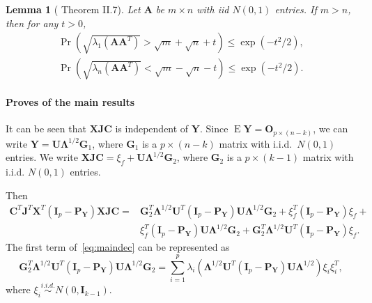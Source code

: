 \documentclass[12pt]{article} %
\DeclareMathOperator{\myE}{E}
\newcommand{\bA}{\mathbf{A}}
\newcommand{\bX}{\mathbf{X}}
\newcommand{\bP}{\mathbf{P}}
\newcommand{\bY}{\mathbf{Y}}
\newcommand{\bG}{\mathbf{G}}
\newcommand{\bJ}{\mathbf{J}}
\newcommand{\bC}{\mathbf{C}}
\newcommand{\bO}{\mathbf{O}}
\newcommand{\bI}{\mathbf{I}}
\newcommand{\bU}{\mathbf{U}}
\newcommand{\bfsym}[1]{\ensuremath{\boldsymbol{#1}}}
\def\bLambda {\bfsym {\Lambda}}
\newtheorem{lemma}{Lemma}
\theoremstyle{definition}
\begin{document}
\begin{lemma}[\citet{DAVIDSON2001317} Theorem II.7]\label{DSbound}
    Let $\bA$ be $m\times n$ with iid $N(0,1)$ entries.
    If $m>n$, then for any $t>0$,
    \begin{align*}
        \Pr(\sqrt{\lambda_1(\bA \bA^T)}>\sqrt{m}+\sqrt{n}+t)\leq \exp(-t^2/2),\\
        \Pr(\sqrt{\lambda_n(\bA \bA^T)}<\sqrt{m}-\sqrt{n}-t)\leq \exp(-t^2/2).
    \end{align*}
\end{lemma}




\paragraph{Proves of the main results}

It can be seen that $\bX\bJ\bC$ is independent of $\bY$.
Since
$
\myE \bY = \bO_{p\times (n-k)}
$,
we can write
$
\bY = \bU\bLambda^{1/2} \bG_1
$,
where $\bG_1$ is a $p\times (n-k)$ matrix with i.i.d.\ $N(0,1)$ entries.
We write
$
\bX\bJ\bC = \xi_f + \bU\bLambda^{1/2} \bG_2
$, 
where $\bG_2$ is a $p\times (k-1)$ matrix with i.i.d. $N(0,1)$ entries.

Then 
\begin{equation}\label{eq:maindec}
\begin{aligned}
\bC^T\bJ^T \bX^T(\bI_p-\bP_{\bY}) \bX\bJ\bC
=&
\bG_2^T \bLambda^{1/2}\bU^T (\bI_p-\bP_{\bY})\bU\bLambda^{1/2}\bG_2+
\xi_f^T (\bI_p -\bP_{\bY})\xi_f+\\
&\xi_f^T (\bI_p -\bP_{\bY})\bU\bLambda^{1/2}\bG_2+
\bG_2^T \bLambda^{1/2}\bU^T (\bI_p-\bP_{\bY})\xi_f.
\end{aligned}
\end{equation}
    The first term of~\eqref{eq:maindec} can be represented as
\begin{equation}\label{eq:firstTerm}
\bG_2^T \bLambda^{1/2}\bU^T (\bI_p-\bP_{\bY})\bU\bLambda^{1/2}\bG_2=
\sum_{i=1}^p \lambda_i (\bLambda^{1/2}\bU^T (\bI_p-\bP_{\bY})\bU\bLambda^{1/2})\xi_i \xi_i^T,
\end{equation}
where $\xi_i\overset{i.i.d.}{\sim} N(0,\bI_{k-1})$.
\end{document}
